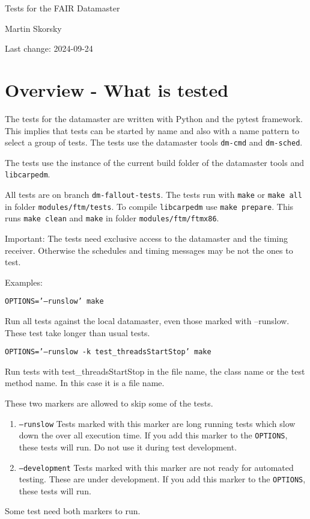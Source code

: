 \documentclass[12pt,a4paper]{report}
\begin{document}
\begin{titlepage}
\vspace{2cm}
\begin{center}
\Huge{Tests for the FAIR Datamaster}

\Large{Martin Skorsky}

\Large{Last change: 2024-09-24}
\end{center}
\vfill
\end{titlepage}

\tableofcontents

\chapter{Overview - What is tested}
The tests for the datamaster are written with Python and the pytest framework. This implies that tests can be started
by name and also with a name pattern to select a group of tests. The tests use the datamaster tools \texttt{dm-cmd}
and \texttt{dm-sched}.

The tests use the instance of the current build folder of the datamaster tools and \texttt{libcarpedm}.

All tests are on branch \texttt{dm-fallout-tests}. The tests run with \texttt{make} or \texttt{make all} in folder \texttt{modules/ftm/tests}.
To compile \texttt{libcarpedm} use \texttt{make prepare}. This runs \texttt{make clean} and \texttt{make} in folder \texttt{modules/ftm/ftmx86}.

Important: The tests need exclusive access to the datamaster and the timing receiver. Otherwise the schedules and timing messages may be not the ones to test.

Examples:

\texttt{OPTIONS='--runslow' make}

Run all tests against the local datamaster, even those marked with --runslow. These test take longer than usual tests.

\texttt{OPTIONS='--runslow -k test\_threadsStartStop' make}

Run tests with test\_threadsStartStop in the file name, the class name or the test method name. In this case it is a file name.

These two markers are allowed to skip some of the tests.
\begin{enumerate}
\item \texttt{--runslow} Tests marked with this marker are long running tests which slow down the over all execution time. If you add this marker to
the \texttt{OPTIONS}, these tests will run. Do not use it during test development.
\item \texttt{--development} Tests marked with this marker are not ready for automated testing. These are under development. If you add this marker
to the \texttt{OPTIONS}, these tests will run.
\end{enumerate}
Some test need both markers to run.
\end{document}
